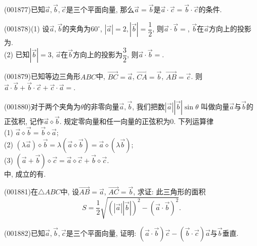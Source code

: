 \item (001877)已知$\overrightarrow{a},\overrightarrow{b},\overrightarrow{c}$是三个平面向量, 那么$\overrightarrow{a}=\overrightarrow{b}$是$\overrightarrow{a}\cdot\overrightarrow{c}=\overrightarrow{b}\cdot\overrightarrow{c}$的条件.
\item (001878)(1) 设$\overrightarrow{a},\overrightarrow{b}$的夹角为$60^\circ$, $|\overrightarrow{a}|=2,|\overrightarrow{b}|=\dfrac{1}{2}$,
则$\overrightarrow{a}\cdot\overrightarrow{b}=$, $\overrightarrow{b}$在$\overrightarrow{a}$方向上的投影为.\\ 
(2) 已知$|\overrightarrow{b}|=3$, $\overrightarrow{a}$在$\overrightarrow{b}$方向上的投影为$\dfrac{3}{2}$, 则$\overrightarrow{a}\cdot\overrightarrow{b}=$.
\item (001879)已知等边三角形$ABC$中, $\overrightarrow{BC}=\overrightarrow{a}$, $\overrightarrow{CA}=\overrightarrow{b}$, $\overrightarrow{AB}=\overrightarrow{c}$. 则$\overrightarrow{a}\cdot\overrightarrow{b}+\overrightarrow{b}\cdot\overrightarrow{c}+\overrightarrow{c}\cdot\overrightarrow{a}=$.
\item (001880)对于两个夹角为$\theta$的非零向量$\overrightarrow{a},\overrightarrow{b}$, 我们把数$\left|\overrightarrow{a}\right|\left|\overrightarrow{b}\right|\sin\theta$
叫做向量$\overrightarrow{a}$与$\overrightarrow{b}$的正弦积, 记作$\overrightarrow{a}\diamond\overrightarrow{b}$.
规定零向量和任一向量的正弦积为$0$. 下列运算律\\ 
(1) $\overrightarrow{a}\diamond\overrightarrow{b}=\overrightarrow{b}\diamond\overrightarrow{a}$;\\ 
(2) $(\lambda \overrightarrow{a})\diamond \overrightarrow{b}=\lambda(\overrightarrow{a}\diamond\overrightarrow{b})=\overrightarrow{a}\diamond(\lambda\overrightarrow{b})$;\\ 
(3) $(\overrightarrow{a}+\overrightarrow{b})\diamond\overrightarrow{c}=\overrightarrow{a}\diamond\overrightarrow{c}+\overrightarrow{b}\diamond\overrightarrow{c}$.
\\中, 成立的有.
\item (001881)在$\triangle ABC$中, 设$\overrightarrow{AB}=\overrightarrow{a}$, $\overrightarrow{AC}=\overrightarrow{b}$, 求证: 此三角形的面积
$$S=\frac{1}{2}\sqrt{(|\overrightarrow{a}||\overrightarrow{b}|)^2-(\overrightarrow{a}\cdot\overrightarrow{b})^2}.$$
\item (001882)已知$\overrightarrow{a},\overrightarrow{b},\overrightarrow{c}$是三个平面向量, 证明: $(\overrightarrow{a}\cdot\overrightarrow{b})\overrightarrow{c}-(\overrightarrow{b}\cdot\overrightarrow{c})\overrightarrow{a}$与$\overrightarrow{b}$垂直.
